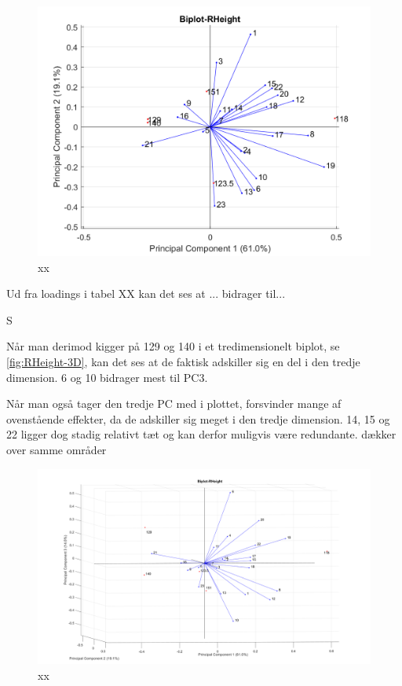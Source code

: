 \begin{figure}[H]
\centering
\includegraphics[width=\textwidth]{Figure/DatabehandlingSkalaer/PCAfigures/RHeight-Biplot.png}
\caption{xx}
\label{fig:RHeight-Biplot}
\end{figure}
 Ud fra loadings i tabel XX kan det ses at ... bidrager til...

S



Når man derimod kigger på 129 og 140 i et tredimensionelt biplot, se \autoref{fig:RHeight-3D}, kan det ses at de faktisk adskiller sig en del i den tredje dimension. 
6 og 10 bidrager mest til PC3.

Når man også tager den tredje PC med i plottet, forsvinder mange af ovenstående effekter, da de adskiller sig meget i den tredje dimension. 14, 15 og 22 ligger dog stadig relativt tæt og kan derfor muligvis være redundante. dækker over samme områder
\begin{figure}[H]
\centering
\includegraphics[width=\textwidth]{Figure/DatabehandlingSkalaer/PCAfigures/RHeight-3D.png}
\caption{xx}
\label{fig:RHeight-3D}
\end{figure}